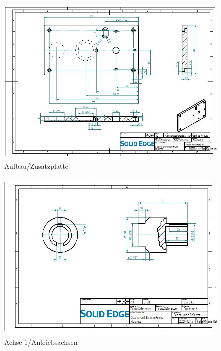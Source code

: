 \begin{figure} [H]
	\begin{center}
		\includegraphics[angle=90]{figures/mechanik/Aufbau_Seitenplatte_Links_Zeichn.jpg}
		\caption{Aufbau/Zusatzplatte}
		\label{fig:Aufbau/Zusatzplatte}
	\end{center}
\end{figure}

\begin{figure} [H]
	\begin{center}
		\includegraphics[angle=90]{figures/mechanik/Antriebsachse_Zeichnung.jpg}
		\caption{Achse 1/Antriebsachsen}
		\label{fig:Achse 1/Antriebsachsen}
	\end{center}
\end{figure}


